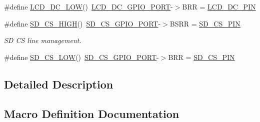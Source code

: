 \begin{DoxyCompactItemize}
\item 
\#define \mbox{\hyperlink{group___s_t_m32_f1_x_x___n_u_c_l_e_o___l_o_w___l_e_v_e_l___exported___macros_gaf196d5f2efab55f6e8e95227b8b82729}{L\+C\+D\+\_\+\+D\+C\+\_\+\+L\+OW}}()~\mbox{\hyperlink{group___s_t_m32_f1_x_x___n_u_c_l_e_o___l_o_w___l_e_v_e_l___exported___constants_gab5a6486a69fe569816e674dfd75390d3}{L\+C\+D\+\_\+\+D\+C\+\_\+\+G\+P\+I\+O\+\_\+\+P\+O\+RT}}-\/$>$B\+RR = \mbox{\hyperlink{group___s_t_m32_f1_x_x___n_u_c_l_e_o___l_o_w___l_e_v_e_l___exported___constants_ga402d8ccd0bb0a6cc377222e75b8e050e}{L\+C\+D\+\_\+\+D\+C\+\_\+\+P\+IN}}
\item 
\#define \mbox{\hyperlink{group___s_t_m32_f1_x_x___n_u_c_l_e_o___l_o_w___l_e_v_e_l___exported___macros_ga8f468ae6303f1d92df76ce993661cb72}{S\+D\+\_\+\+C\+S\+\_\+\+H\+I\+GH}}()~\mbox{\hyperlink{group___s_t_m32_f1_x_x___n_u_c_l_e_o___l_o_w___l_e_v_e_l___exported___constants_gaaaff9bd4922137edd642571ec1cafda3}{S\+D\+\_\+\+C\+S\+\_\+\+G\+P\+I\+O\+\_\+\+P\+O\+RT}}-\/$>$B\+S\+RR = \mbox{\hyperlink{group___s_t_m32_f1_x_x___n_u_c_l_e_o___l_o_w___l_e_v_e_l___exported___constants_ga04d57a6c18b2d5e81f31093e58ed0c62}{S\+D\+\_\+\+C\+S\+\_\+\+P\+IN}}
\begin{DoxyCompactList}\small\item\em SD CS line management. \end{DoxyCompactList}\item 
\#define \mbox{\hyperlink{group___s_t_m32_f1_x_x___n_u_c_l_e_o___l_o_w___l_e_v_e_l___exported___macros_gaac4b728222e9597d36fcc079324da267}{S\+D\+\_\+\+C\+S\+\_\+\+L\+OW}}()~\mbox{\hyperlink{group___s_t_m32_f1_x_x___n_u_c_l_e_o___l_o_w___l_e_v_e_l___exported___constants_gaaaff9bd4922137edd642571ec1cafda3}{S\+D\+\_\+\+C\+S\+\_\+\+G\+P\+I\+O\+\_\+\+P\+O\+RT}}-\/$>$B\+RR = \mbox{\hyperlink{group___s_t_m32_f1_x_x___n_u_c_l_e_o___l_o_w___l_e_v_e_l___exported___constants_ga04d57a6c18b2d5e81f31093e58ed0c62}{S\+D\+\_\+\+C\+S\+\_\+\+P\+IN}}
\end{DoxyCompactItemize}


\subsection{Detailed Description}


\subsection{Macro Definition Documentation}
\mbox{\label{group___s_t_m32_f1_x_x___n_u_c_l_e_o___l_o_w___l_e_v_e_l___exported___macros_gaac8fef3913f432c818b6564644b0dd85}} 
